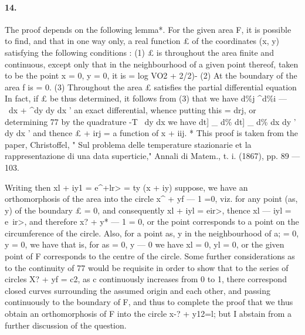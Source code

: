 \documentclass[11pt,a4paper]{book}
\begin{document}
{{{{{{\paragraph{14.} The  proof  depends  on  the  following  lemma*.
For   the   given   area   F,    it    is   possible   to   find,   and   that   in    one    way   only,   a    real
function  £  of  the  coordinates  (x,  y)  satisfying  the  following  conditions  :
(1)  £    is    throughout    the    area    finite    and    continuous,    except    only    that    in    the
neighbourhood    of    a    given    point    thereof,    taken    to    be    the    point   x  =  0,   y  =  0,   it   is
=  log  VO2  +  2/2)-
(2)  At  the  boundary  of  the  area  f  is  =  0.
(3)  Throughout  the  area  £  satisfies  the  partial  differential  equation
In  fact,  if  £  be  thus  determined,  it  follows  from  (3)  that  we  have
d\%j    ^d\%i
---  ~dx  +  ^dy
dy          dx   '
an  exact  differential,  whence  putting  this  =  drj,  or  determining  77  by  the  quadrature
-T~
dy          dx
we  have
dt]  \_     d\%        dt]  \_  d\%
dx         dy  '      dy     dx  '
and  thence  £  +  irj  =  a  function  of  x  +  iij.
*  This  proof   is    taken    from    the    paper,   Christoffel,    "  Sul    problema    delle    temperature    stazionarie    et    la
rappresentazione  di  una  data  superticie,"  Annali  di  Matem.,  t.  i.  (1867),  pp.  89  ---  103.


Writing  then  xl  +  iy1  =  e^+lr>  =  ty  (x  +  iy)  suppose,  we  have  an  orthomorphosis  of
the  area  into  the  circle  x^  +  yf  ---  1  =0,  viz.  for  any  point  (as,  y)  of  the  boundary
£  =  0,  and  consequently  xl  +  iyl  =  eir>,  thence  xl  ---  iyl  =  e~ir>,  and  therefore  x?  +  y*  ---  1  =  0,
or  the  point  corresponds  to  a  point  on  the  circumference  of  the  circle.  Also,  for  a
point  as,  y  in  the  neighbourhood  of  a;  =  0,  y  =  0,  we  have
that   is,    for   as  =  0,    y  ---  0    we    have   xl  =  0,    yl  =  0,    or    the    given    point    of    F  corresponds
to  the  centre  of  the  circle.
Some  further  considerations  as  to  the  continuity  of  77  would  be  requisite  in  order
to  show  that  to  the  series  of  circles  X?  +  yf  =  c2,  as  c  continuously  increases  from  0
to  1,  there  correspond  closed  curves  surrounding  the  assumed  origin  and  each  other,
and  passing  continuously  to  the  boundary  of  F,  and  thus  to  complete  the  proof  that
we  thus  obtain  an  orthomorphosis  of  F  into  the  circle  x-?  +  y12=l;  but  I  abstain
from  a  further  discussion  of  the  question.
}}}}}}
\end{document}
